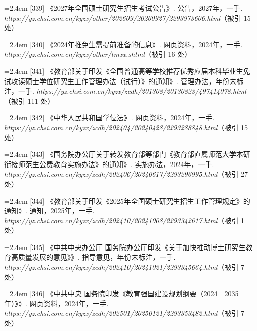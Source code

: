 {\vspace{0.6pt}
\noindent\hangindent=2.4em \label{src:S0452}{\color{cAccent}[339]} 《2027年全国硕士研究生招生考试公告》. 公告，2027年，一手. \textit{https://yz.chsi.com.cn/kyzx/other/202609/20260927/2293973606.html}（被引 15 处）\par
\vspace{0.6pt}
\noindent\hangindent=2.4em \label{src:S0453}{\color{cAccent}[340]} 《2024年推免生需提前准备的信息》. 网页资料，2024年，一手. \textit{https://yz.chsi.com.cn/kyzx/other/tmxx.shtml}（被引 16 处）\par
\vspace{0.6pt}
\noindent\hangindent=2.4em \label{src:S0454}{\color{cAccent}[341]} 《教育部关于印发《全国普通高等学校推荐优秀应届本科毕业生免试攻读硕士学位研究生工作管理办法（试行）》的通知》. 管理办法，年份未标注，一手. \textit{https://yz.chsi.com.cn/kyzx/zcdh/201308/20130823/497414078.html}（被引 111 处）\par
\vspace{0.6pt}
\noindent\hangindent=2.4em \label{src:S0455}{\color{cAccent}[342]} 《中华人民共和国学位法》. 网页资料，2024年，一手. \textit{https://yz.chsi.com.cn/kyzx/zcdh/202404/20240428/2293288848.html}（被引 15 处）\par
\vspace{0.6pt}
\noindent\hangindent=2.4em \label{src:S0456}{\color{cAccent}[343]} 《国务院办公厅关于转发教育部等部门《教育部直属师范大学本研衔接师范生公费教育实施办法》的通知》. 实施办法，2024年，一手. \textit{https://yz.chsi.com.cn/kyzx/zcdh/202406/20240617/2293296995.html}（被引 27 处）\par
\vspace{0.6pt}
\noindent\hangindent=2.4em \label{src:S0457}{\color{cAccent}[344]} 《教育部关于印发《2025年全国硕士研究生招生工作管理规定》的通知》. 通知，2025年，一手. \textit{https://yz.chsi.com.cn/kyzx/zcdh/202410/20241008/2293342617.html}（被引 1 处）\par
\vspace{0.6pt}
\noindent\hangindent=2.4em \label{src:S0459}{\color{cAccent}[345]} 《中共中央办公厅 国务院办公厅印发《关于加快推动博士研究生教育高质量发展的意见》》. 指导意见，年份未标注，一手. \textit{https://yz.chsi.com.cn/kyzx/zcdh/202410/20241021/2293345664.html}（被引 7 处）\par
\vspace{0.6pt}
\noindent\hangindent=2.4em \label{src:S0460}{\color{cAccent}[346]} 《中共中央 国务院印发《教育强国建设规划纲要（2024－2035年）》》. 网页资料，2024年，一手. \textit{https://yz.chsi.com.cn/kyzx/zcdh/202501/20250121/2293353482.html}（被引 7 处）\par
}
